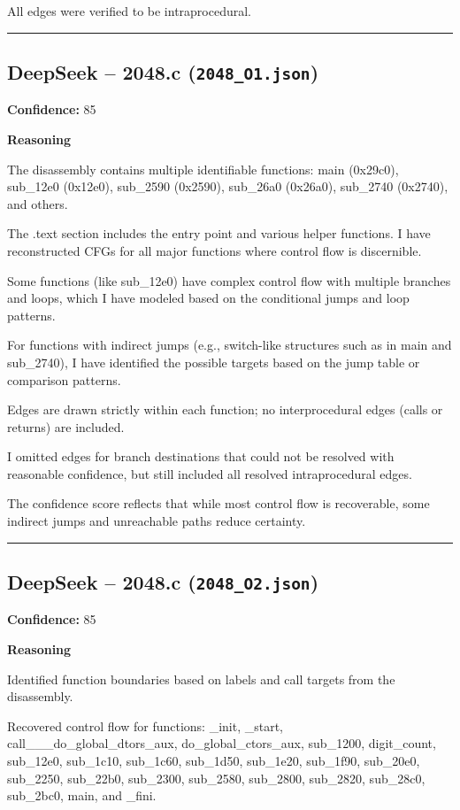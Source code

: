 All edges were verified to be intraprocedural.

\bigskip
\hrule
\bigskip

\subsection{DeepSeek -- 2048.c (\texttt{2048\_O1.json})}

\textbf{Confidence:} 85

\textbf{Reasoning}

The disassembly contains multiple identifiable functions: main (0x29c0), sub\_12e0 (0x12e0), sub\_2590 (0x2590), sub\_26a0 (0x26a0), sub\_2740 (0x2740), and others.

The .text section includes the entry point and various helper functions. I have reconstructed CFGs for all major functions where control flow is discernible.

Some functions (like sub\_12e0) have complex control flow with multiple branches and loops, which I have modeled based on the conditional jumps and loop patterns.

For functions with indirect jumps (e.g., switch-like structures such as in main and sub\_2740), I have identified the possible targets based on the jump table or comparison patterns.

Edges are drawn strictly within each function; no interprocedural edges (calls or returns) are included.

I omitted edges for branch destinations that could not be resolved with reasonable confidence, but still included all resolved intraprocedural edges.

The confidence score reflects that while most control flow is recoverable, some indirect jumps and unreachable paths reduce certainty.

\bigskip
\hrule
\bigskip

\subsection{DeepSeek -- 2048.c (\texttt{2048\_O2.json})}

\textbf{Confidence:} 85

\textbf{Reasoning}

Identified function boundaries based on labels and call targets from the disassembly.

Recovered control flow for functions: \_init, \_start, call\_\_\_do\_global\_dtors\_aux, do\_global\_ctors\_aux, sub\_1200, digit\_count, sub\_12e0, sub\_1c10, sub\_1c60, sub\_1d50, sub\_1e20, sub\_1f90, sub\_20e0, sub\_2250, sub\_22b0, sub\_2300, sub\_2580, sub\_2800, sub\_2820, sub\_28c0, sub\_2bc0, main, and \_fini.

